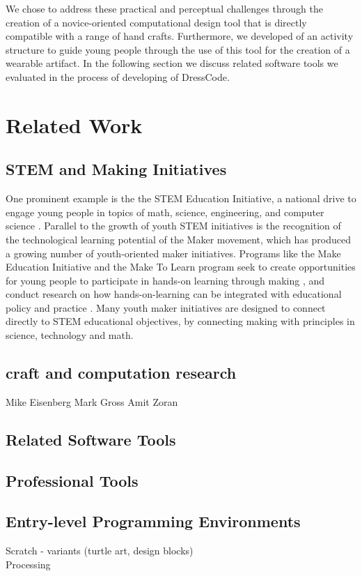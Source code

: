 \documentclass{sigchi}
\begin{document}
We chose to address these practical and perceptual challenges through the creation of a novice-oriented computational design tool that is directly compatible with a range of hand crafts. Furthermore, we developed of an activity structure to guide young people through the use of this tool for the creation of a wearable artifact. In the following section we discuss related software tools we evaluated in the process of developing of DressCode.
\section{Related Work}
\subsection{STEM and Making Initiatives}
One prominent example is the the STEM Education Initiative, a national drive to engage young people in topics of math, science, engineering, and computer science \cite{stemReport}. Parallel to the growth of youth STEM initiatives is the recognition of the technological learning potential of the Maker movement, which has produced a growing number of youth-oriented maker initiatives. Programs like the Make Education Initiative and the Make To Learn program seek to create opportunities for young people to participate in hands-on learning through making \cite{makerinitiatives}, and conduct research on how hands-on-learning can be integrated with educational policy and practice \cite{maketolearn}. Many youth maker initiatives are designed to connect directly to STEM educational objectives, by connecting making with principles in science, technology and math.
\subsection{craft and computation research}
Mike Eisenberg
Mark Gross
Amit Zoran

\subsection{Related Software Tools}
\subsection{Professional Tools}
\subsection{Entry-level Programming Environments}
Scratch - variants (turtle art, design blocks) \\
Processing \\
\end{document}

